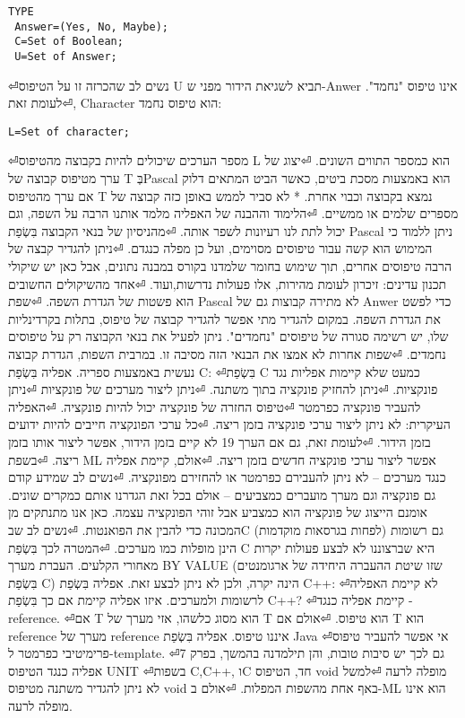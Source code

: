 \begin{טבלא}[!htbp]
\begin{verbatim}
TYPE
 Answer=(Yes, No, Maybe);
 C=Set of Boolean;
 U=Set of Answer;
\end{verbatim}
⏎נשים לב שהכרזה זו על הטיפוס U תביא לשגיאת הידור מפני ש-Anwer אינו טיפוס "נחמד".
⏎לעומת זאת, Character הוא טיפוס נחמד:
\begin{verbatim}
L=Set of character;
\end{verbatim}
⏎מספר הערכים שיכולים להיות בקבוצה מהטיפוס L הוא כמספר התווים השונים.
⏎יצוג של ערך
      מטיפוס קבוצה של
      T בְּPascal הוא
      באמצעות מסכת
      ביטים, כאשר הביט
      המתאים דלוק אם
      ערך מהטיפוס T
      נמצא בקבוצה
      וכבוי אחרת. *
      לא סביר לממש
      באופן כזה קבוצה
      של מספרים שלמים
      או ממשיים.
⏎הלימוד וההבנה של האפליה מלמד אותנו הרבה על השפה, וגם יכול לתת לנו רעיונות לשפר אותה.
⏎מהניסיון של בנאי הקבוצה בִּשְׂפַת Pascal ניתן ללמוד כי המימוש הוא קשה עבור טיפוסים מסוימים, ועל כן מפלה כנגדם.
⏎ניתן להגדיר קבצה של הרבה טיפוסים אחרים, תוך שימוש בחומר שלמדנו בקורס במבנה נתונים, אבל כאן יש שיקולי תכנון עדינים: זיכרון לעומת מהירות, אלו פעולות נדרשות,ועוד.
⏎אחד מהשיקולים החשובים הוא פשטות של הגדרת השפה.
⏎שפת Pascal לא מתירה קבוצות גם של Anwer כדי לפשט את הגדרת השפה. במקום להגדיר מתי אפשר להגדיר קבוצה של טיפוס, בתלות בקרדינליות שלו, יש רשימה סגורה של טיפוסים "נחמדים". ניתן לפעיל את בנאי הקבוצה רק על טיפוסים נחמדים.
⏎שפות אחרות לא אמצו את הבנאי הזה מסיבה זו. במרבית השפות, הגדרת קבוצה נעשית באמצעות ספריה.
      אפליה בִּשְׂפַת C:
⏎בִּשְׂפַת C כמעט שלא קיימות אפליות נגד פונקציות.
⏎ניתן להחזיק פונקציה בתוך משתנה.
⏎ניתן ליצור מערכים של פונקציות
⏎ניתן להעביר פונקציה כפרמטר
⏎טיפוס החזרה של פונקציה יכול להיות פונקציה.
⏎האפליה העיקרית: לא ניתן ליצור ערכי פונקציה בזמן ריצה.
⏎כל ערכי הפונקציה חייבים להיות ידועים בזמן הידור.
⏎לעומת זאת, גם אם הערך 19 לא קיים בזמן הידור, אפשר ליצור אותו בזמן ריצה.
⏎בשפת ML אפשר ליצור ערכי פונקציה חדשים בזמן ריצה.
⏎אולם, קיימת אפליה כנגד מערכים – לא ניתן להעבירם כפרמטר או להחזירם מפונקציה.
⏎נשים לב שמידע קודם גם פונקציה וגם מערך מועברים כמצביעים – אולם בכל זאת הגדרנו אותם כמקרים שונים. אומנם הייצוג של פונקציה הוא כמצביע אבל זוהי הפונקציה עצמה. כאן אנו מתנתקים מן המכונה כדי להבין את הפואנטות.
⏎נשים לב שבC (לפחות בגרסאות מוקדמות) גם רשומות הינן מופלות כמו מערכים.
⏎המטרה לכך בִּשְׂפַת C היא שברצוננו לא לבצע פעולות יקרות מאחורי הקלעים. העברת מערך BY VALUE (שזו שיטת ההעברה היחידה של ארגומנטים בִּשְׂפַת C) הינה יקרה, ולכן לא ניתן לבצע זאת.
      אפליה בִּשְׂפַת C++:
⏎לא קיימת האפליה לרשומות ולמערכים. איזו אפליה קיימת אם כך בִּשְׂפַת C++?
⏎קיימת אפליה כנגד -reference.
⏎אם T הוא מסוג כלשהו, אזי מערך של T הוא טיפוס.
⏎אולם אם T הוא reference מערך של reference איננו טיפוס.
      אפליה בִּשְׂפַת Java
⏎אי אפשר להעביר טיפוס פרימיטיבי כפרמטר ל-template.
⏎גם לכך יש סיבות טובות, והן תילמדנה בהמשך, בפרק 7
      אפליה כנגד הטיפוס UNIT
⏎בשפות C,C++, וC חד, הטיפוס void מופלה לרעה
⏎למשל לא ניתן להגדיר משתנה מטיפוס void באף אחת מהשפות המפלות.
⏎אולם ב-ML הוא אינו מופלה לרעה.


\end{טבלא}
